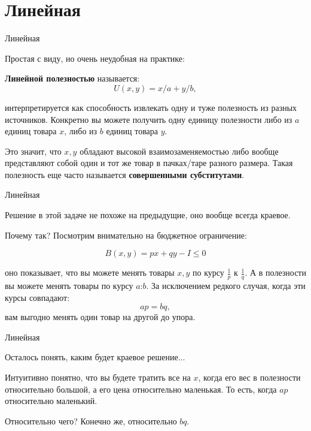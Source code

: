 \documentclass{beamer}
\begin{document}
\section{Линейная}

\begin{frame}{Линейная}

Простая с виду, но очень неудобная на практике:

\begin{definition}
\textbf{Линейной полезностью} называется:
$$U(x, y) = x/a +y/b,$$ 
\end{definition}

интерпретируется как способность извлекать одну и туже полезность из разных источников.  Конкретно вы можете получить одну единицу полезности либо из $a$ единиц товара $x$, либо из $b$ единиц товара $y$. 

Это значит, что $x, y$ обладают высокой взаимозаменяемостью либо вообще представляют собой один и тот же товар в пачках/таре разного размера. Такая полезность еще часто называется \textbf{совершенными субститутами}.

\end{frame}

\begin{frame}{Линейная}

Решение в этой задаче не похоже на предыдущие, оно вообще всегда краевое. 

Почему так? Посмотрим внимательно на бюджетное ограничение:

$$B(x,y) = px + qy - I \leqslant 0$$ 

оно показывает, что вы можете менять товары $x, y$ по курсу $\frac{1}{p}$ к $\frac{1}{q}$. А в полезности вы можете менять товары по курсу $a$:$b$. За исключением редкого случая, когда эти курсы совпадают: 
$$ap = bq,$$ 
вам выгодно менять один товар на другой до упора.
\end{frame}

\begin{frame}{Линейная}

Осталось понять, каким будет краевое решение...

Интуитивно понятно, что вы будете тратить все на $x$, когда его вес в полезности относительно большой, а его цена относительно маленькая. То есть, когда $ap$ относительно маленький. 

Относительно чего? Конечно же, относительно $bq$.

\end{frame}
\end{document}
